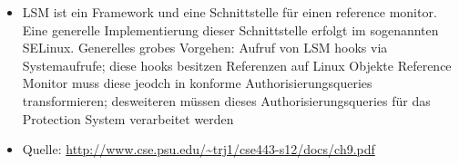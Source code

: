 \documentclass{scrartcl}
\begin{document}
\begin{itemize}
  \item LSM ist ein Framework und eine Schnittstelle für einen reference monitor. Eine generelle
  Implementierung dieser Schnittstelle erfolgt im sogenannten SELinux. Generelles grobes Vorgehen:
  Aufruf von LSM hooks via Systemaufrufe; diese hooks besitzen Referenzen auf Linux Objekte
  Reference Monitor muss diese jeodch in konforme Authorisierungsqueries
  transformieren; desweiteren müssen dieses Authorisierungsqueries für das Protection System
  verarbeitet werden
  \item Quelle: \url{http://www.cse.psu.edu/~trj1/cse443-s12/docs/ch9.pdf}
\end{itemize}
\end{document}
